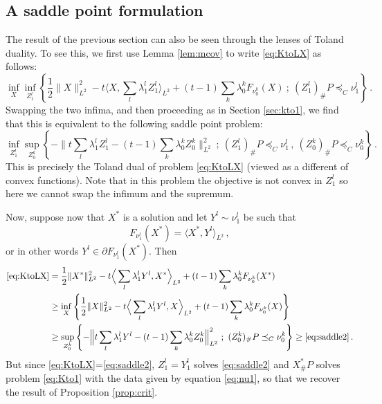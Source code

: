 \documentclass[12pt]{amsart}
\numberwithin{equation}{section}
\theoremstyle{plain}
\theoremstyle{definition}
\begin{document}
\subsection{A saddle point formulation} \label{sec:saddle} The result of the previous section can also be seen through the lenses of Toland duality. To see this, we first use Lemma \ref{lem:mcov} to write \eqref{eq:KtoLX} as follows: 
\[
\inf_X \inf_{Z_1^l} \left\{\frac{1}{2} \|X\|^2_{L^2}
-t \Big\langle X, \sum_l \lambda_1^l Z_1^l \Big\rangle_{L^2} + (t-1) \sum_k \lambda_0^k F_{\nu_0^k}(X) ~;~ (Z_1^l)_\# P \preceq_C \nu_1^l   \right\}\,.
\]
Swapping the two infima, and then proceeding as in Section \ref{sec:kto1}, we find that this is equivalent to the following saddle point problem:
\begin{equation}\label{eq:saddle2}
\inf_{Z_1^l} \sup_{Z_0^k} \left\{ - \Big\| t \sum_l \lambda_1^l Z_1^l - (t-1) \sum_k \lambda_0^k Z_0^k \Big \|^2_{L^2} ~;~ (Z_1^l)_\# P \preceq_C \nu_1^l \,, ~(Z_0^k)_\# P \preceq_C \nu_0^k  \right\}\,.
\end{equation}
This is precisely the Toland dual of problem \eqref{eq:KtoLX} (viewed as a different of convex functions).
Note that in this problem the objective is not convex in $Z_1^l$ so here we cannot swap the infimum and the supremum. 

Now, suppose now that $X^*$ is a solution and let $Y^l \sim \nu_1^l$ be such that 
\[
F_{\nu_1^l}(X^*) = \langle X^*, Y^l\rangle_{L^2} \,,
\]
or in other words $Y^l \in \partial F_{\nu_1^l}(X^*)$.
Then
\[
\begin{aligned}
\eqref{eq:KtoLX} &= \frac{1}{2} \|X^*\|^2_{L^2}
-t \Big\langle \sum_l \lambda_1^l Y^l,X^* \Big\rangle_{L^2} + (t-1) \sum_k \lambda_0^k F_{\nu_0^k}(X^*)
\\&\geq 
\inf_X \left\{\frac{1}{2} \|X\|^2_{L^2}
-t \Big\langle \sum_l \lambda_1^l Y^l,X \Big\rangle_{L^2} + (t-1) \sum_k \lambda_0^k F_{\nu_0^k}(X)\right\}
\\&\geq 
\sup_{Z_0^k} \left\{ - \Big\| t \sum_l \lambda_1^l Y^l - (t-1) \sum_k \lambda_0^k Z_0^k \Big \|^2_{L^2} ~; ~(Z_0^k)_\# P \preceq_C \nu_0^k  \right\} \geq \eqref{eq:saddle2}\,.
\end{aligned}
\]
But since \eqref{eq:KtoLX}=\eqref{eq:saddle2}, $Z_1^l = Y_1^l$ solves \eqref{eq:saddle2} and $X_\#^* P$ solves problem \eqref{eq:Kto1} with the data given by equation \eqref{eq:nu1}, so that we recover the result of Proposition \ref{prop:crit}.
\end{document}
